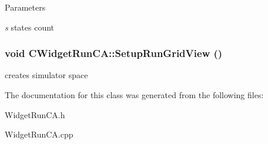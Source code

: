 \begin{DoxyParams}{Parameters}
\item[{\em s}]states count \end{DoxyParams}
\hypertarget{classCWidgetRunCA_af91de52e2c23a56f5fc24b46cd8fd043}{
\subsubsection[{SetupRunGridView}]{\setlength{\rightskip}{0pt plus 5cm}void CWidgetRunCA::SetupRunGridView ()}}
\label{classCWidgetRunCA_af91de52e2c23a56f5fc24b46cd8fd043}
creates simulator space 

The documentation for this class was generated from the following files:\begin{DoxyCompactItemize}
\item 
WidgetRunCA.h\item 
WidgetRunCA.cpp\end{DoxyCompactItemize}

